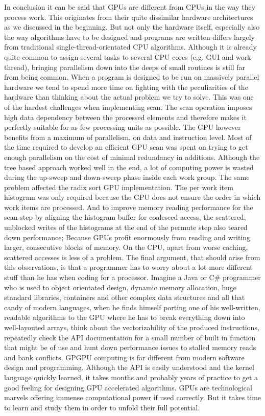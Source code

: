 In conclusion it can be said that GPUs are different from CPUs in the way they process work. This originates from their quite dissimilar hardware architectures as we discussed in the beginning. But not only the hardware itself, especially also the way algorithms have to be designed and programs are written differs largely from traditional single-thread-orientated CPU algorithms. Although it is already quite common to assign several tasks to several CPU cores (e.g. GUI and work thread), bringing parallelism down into the deeps of small routines is still far from being common. When a program is designed to be run on massively parallel hardware we tend to spend more time on fighting with the peculiarities of the hardware than thinking about the actual problem we try to solve. This was one of the hardest challenges when implementing scan. The scan operation imposes high data dependency between the processed elements and therefore makes it perfectly suitable for as few processing units as possible. The GPU however benefits from a maximum of parallelism, on data and instruction level. Most of the time required to develop an efficient GPU scan was spent on trying to get enough parallelism on the cost of minimal redundancy in additions. Although the tree based approach worked well in the end, a lot of computing power is wasted during the up-sweep and down-sweep phase inside each work group. The same problem affected the radix sort GPU implementation. The per work item histogram was only required because the GPU does not ensure the order in which work items are processed. And to improve memory reading performance for the scan step by aligning the histogram buffer for coalesced access, the scattered, unblocked writes of the histograms at the end of the permute step also teared down performance; Because GPUs profit enormously from reading and writing larger, consecutive blocks of memory. On the CPU, apart from worse caching, scattered accesses is less of a problem. The final argument, that should arise from this observations, is that a programmer has to worry about a lot more different stuff than he has when coding for a processor. Imagine a Java or C\# programmer who is used to object orientated design, dynamic memory allocation, huge standard libraries, containers and other complex data structures and all that candy of modern languages, when he finds himself porting one of his well-written, readable algorithms to the GPU where he has to break everything down into well-layouted arrays, think about the vectorizability of the produced instructions, repeatedly check the API documentation for a small number of built in function that might be of use and hunt down performance issues to stalled memory reads and bank conflicts. GPGPU computing is far different from modern software design and programming. Although the API is easily understood and the kernel language quickly learned, it takes months and probably years of practice to get a good feeling for designing GPU accelerated algorithms. GPUs are technological marvels offering immense computational power if used correctly. But it takes time to learn and study them in order to unfold their full potential.

